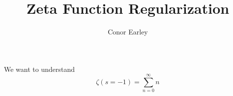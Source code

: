 \documentclass{article}
\title{Zeta Function Regularization}
\author{Conor Earley}
\begin{document}
\maketitle

We want to understand 
\[

\zeta (s=-1) = \sum_{n=0}^{\infty} n

\]
\end{document}
